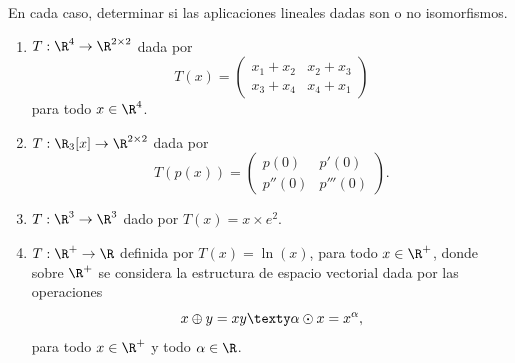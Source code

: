 \documentclass[a4,11pt]{aleph-notas}
\begin{document}
\begin{ejer}
    En cada caso, determinar si las aplicaciones lineales dadas son o no isomorfismos.
\begin{enumerate}
    \item $T:\R^4\to \R^{2\times 2}$ dada por 
    \[
        T(x) = \begin{pmatrix}
        x_1 + x_2 & x_2 + x_3\\
        x_3 + x_4 & x_4 + x_1
        \end{pmatrix}
    \]
    para todo $x\in\R^4$.
    \item $T:\R_3[x]\to \R^{2\times 2}$ dada por
    \[
        T(p(x)) = \begin{pmatrix}
        p(0) & p'(0) \\
        p''(0) & p'''(0)
        \end{pmatrix}.
    \]
    \item $T:\R^3 \to \R^3$ dado por $T(x) = x\times e^2$.
    \item $T:\R^+\to \R$ definida por $T(x)=\ln(x)$, para todo $x\in\R^+$, donde sobre $\R^+$ se considera la estructura de espacio vectorial dada por las operaciones
    \[
        x\oplus y = xy \texty \alpha\odot x = x^\alpha,
    \]
    para todo $x\in\R^+$ y todo $\alpha\in\R$.
\end{enumerate}
\end{ejer}
\end{document}
